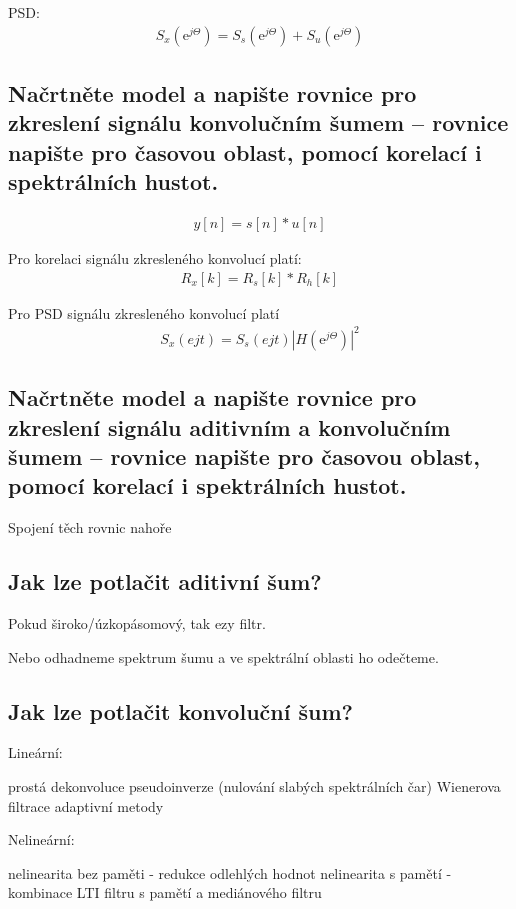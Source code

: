 \documentclass[a4paper,12pt]{article}   %
\newcommand{\ejt}{\text{e}^{j\Theta}}
\begin{document}
PSD:
\begin{align*}
        S_x(\ejt) = S_s(\ejt) + S_u(\ejt)
\end{align*}


\subsection{Načrtněte model a napište rovnice pro zkreslení signálu konvolučním šumem – rovnice napište pro časovou oblast, pomocí korelací i spektrálních hustot.}
\begin{align*}
        y[n] = s[n]\ast u[n]
\end{align*}

Pro korelaci signálu zkresleného konvolucí platí:
\begin{align*}
        R_x[k] = R_s[k]\ast R_h[k]
\end{align*}

Pro PSD signálu zkresleného konvolucí platí
\begin{align*}
        S_x(ejt) = S_s(ejt)|H(\ejt)|^2
\end{align*}


\subsection{Načrtněte model a napište rovnice pro zkreslení signálu aditivním a konvolučním šumem – rovnice napište pro časovou oblast, pomocí korelací i spektrálních hustot.}

Spojení těch rovnic nahoře


\subsection{Jak lze potlačit aditivní šum?}
Pokud široko/úzkopásomový, tak ezy filtr. 

Nebo odhadneme spektrum šumu a ve spektrální oblasti ho odečteme.


\subsection{Jak lze potlačit konvoluční šum?}

Lineární:
\begin{outline}
        \1 prostá dekonvoluce
        \1 pseudoinverze (nulování slabých spektrálních čar)
        \1 Wienerova filtrace 
        \1 adaptivní metody
\end{outline}

Nelineární:
\begin{outline}
        \1 nelinearita bez paměti - redukce odlehlých hodnot
        \1 nelinearita s pamětí - kombinace LTI filtru s pamětí a mediánového filtru
\end{outline}
\end{document}
